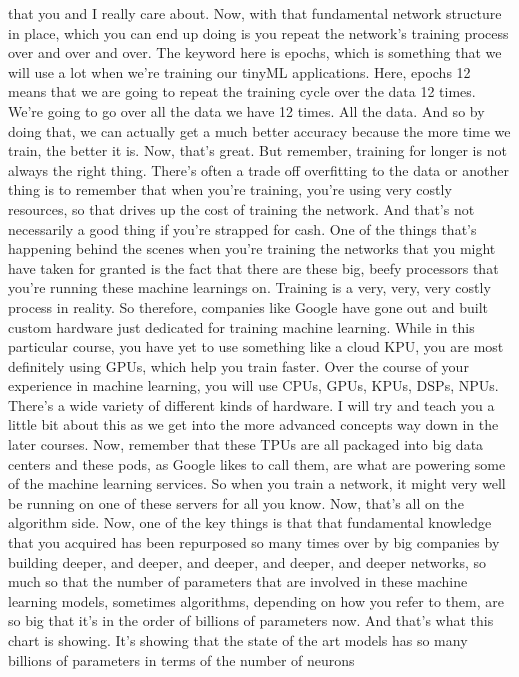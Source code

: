 that you and I really care about.
Now, with that fundamental network structure in place,
which you can end up doing is you repeat the network's training
process over and over and over.
The keyword here is epochs, which is something
that we will use a lot when we're training our tinyML applications.
Here, epochs 12 means that we are going to repeat the training
cycle over the data 12 times.
We're going to go over all the data we have 12 times.
All the data.
And so by doing that, we can actually get a much better accuracy
because the more time we train, the better it is.
Now, that's great.
But remember, training for longer is not always the right thing.
There's often a trade off overfitting to the data
or another thing is to remember that when you're training,
you're using very costly resources, so that drives up
the cost of training the network.
And that's not necessarily a good thing if you're strapped for cash.
One of the things that's happening behind the scenes
when you're training the networks that you might have taken for granted
is the fact that there are these big, beefy processors that you're
running these machine learnings on.
Training is a very, very, very costly process in reality.
So therefore, companies like Google have gone out
and built custom hardware just dedicated for training machine learning.
While in this particular course, you have yet
to use something like a cloud KPU, you are most definitely using
GPUs, which help you train faster.
Over the course of your experience in machine learning,
you will use CPUs, GPUs, KPUs, DSPs, NPUs.
There's a wide variety of different kinds of hardware.
I will try and teach you a little bit about this
as we get into the more advanced concepts way down in the later courses.
Now, remember that these TPUs are all packaged
into big data centers and these pods, as Google likes to call them,
are what are powering some of the machine learning services.
So when you train a network, it might very well
be running on one of these servers for all you know.
Now, that's all on the algorithm side.
Now, one of the key things is that that fundamental knowledge that you acquired
has been repurposed so many times over by big companies by building
deeper, and deeper, and deeper, and deeper, and deeper networks, so much so
that the number of parameters that are involved in these machine learning
models, sometimes algorithms, depending on how you refer to them,
are so big that it's in the order of billions of parameters now.
And that's what this chart is showing.
It's showing that the state of the art models
has so many billions of parameters in terms of the number of neurons
